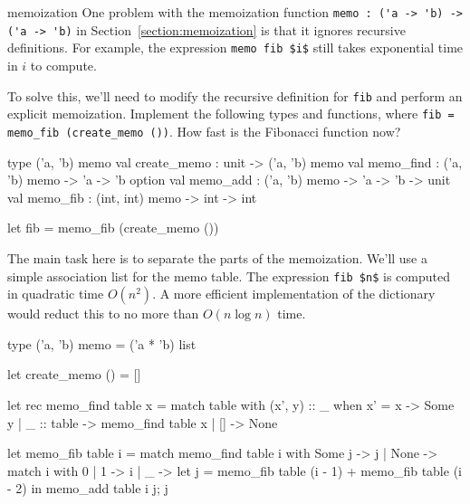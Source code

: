 %
\begin{exercise}{memoization}
One problem with the memoization function \hbox{\lstinline/memo : ('a -> 'b) -> ('a -> 'b)/} in
Section~\ref{section:memoization} is that it ignores recursive definitions.  For example,
the expression \hbox{\lstinline/memo fib $i$/} still takes exponential time in $i$ to compute.

To solve this, we'll need to modify the recursive definition for \hbox{\lstinline/fib/} and perform an
explicit memoization.  Implement the following types and functions, where
%
\hbox{\lstinline/fib = memo_fib (create_memo ())/}.  How fast is the Fibonacci function now?

\begin{ocaml}
type ('a, 'b) memo
val create_memo : unit -> ('a, 'b) memo
val memo_find   : ('a, 'b) memo -> 'a -> 'b option
val memo_add    : ('a, 'b) memo -> 'a -> 'b -> unit
val memo_fib    : (int, int) memo -> int -> int

let fib = memo_fib (create_memo ())
\end{ocaml}

\begin{answer}\ifanswers
The main task here is to separate the parts of the memoization.  We'll use a simple association list
for the memo table.  The expression \hbox{\lstinline/fib $n$/} is computed in quadratic time $O(n^2)$.  A
more efficient implementation of the dictionary would reduct this to no more than $O(n \log n)$
time.

\begin{ocaml}
type ('a, 'b) memo = ('a * 'b) list

let create_memo () = []

let rec memo_find table x =
   match table with
      (x', y) :: _ when x' = x -> Some y
    | _ :: table -> memo_find table x
    | [] -> None

let memo_fib table i =
   match memo_find table i with
      Some j -> j
    | None -> 
        match i with
           0 | 1 -> i
         | _ ->
            let j = memo_fib table (i - 1) + memo_fib table (i - 2) in
            memo_add table i j;
            j
\end{ocaml}
\fi\end{answer}
\end{exercise}

